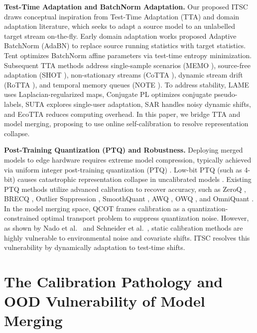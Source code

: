 \documentclass{article}
\theoremstyle{plain}
\theoremstyle{definition}
\theoremstyle{remark}
\begin{document}
\textbf{Test-Time Adaptation and BatchNorm Adaptation.} Our proposed ITSC draws conceptual inspiration from Test-Time Adaptation (TTA) and domain adaptation literature, which seeks to adapt a source model to an unlabelled target stream on-the-fly. Early domain adaptation works proposed Adaptive BatchNorm (AdaBN) \cite{li16adabn, li18} to replace source running statistics with target statistics. Tent \cite{wang21tent} optimizes BatchNorm affine parameters via test-time entropy minimization. Subsequent TTA methods address single-sample scenarios (MEMO \cite{zhang22memo}), source-free adaptation (SHOT \cite{liang20shot}), non-stationary streams (CoTTA \cite{wang22cotta}), dynamic stream drift (RoTTA \cite{yuan23rotta}), and temporal memory queues (NOTE \cite{gong22note}). To address stability, LAME \cite{boudiaf21lame} uses Laplacian-regularized maps, Conjugate PL \cite{goyal22conjugate} optimizes conjugate pseudo-labels, SUTA \cite{zhao23suta} explores single-user adaptation, SAR \cite{niu23sar} handles noisy dynamic shifts, and EcoTTA \cite{song23ecotta} reduces computing overhead. In this paper, we bridge TTA and model merging, proposing to use online self-calibration to resolve representation collapse.

\textbf{Post-Training Quantization (PTQ) and Robustness.} Deploying merged models to edge hardware requires extreme model compression, typically achieved via uniform integer post-training quantization (PTQ) \cite{gholami21}. Low-bit PTQ (such as 4-bit) causes catastrophic representation collapse in uncalibrated models \cite{anonymous26b}. Existing PTQ methods utilize advanced calibration to recover accuracy, such as ZeroQ \cite{cai20zeroq}, BRECQ \cite{li21brecq}, Outlier Suppression \cite{wei22outlier}, SmoothQuant \cite{xiao23smoothquant}, AWQ \cite{lin24awq}, OWQ \cite{lee23owq}, and OmniQuant \cite{shao24omniquant}. In the model merging space, QCOT \cite{anonymous26c} frames calibration as a quantization-constrained optimal transport problem to suppress quantization noise. However, as shown by Nado et al.\ \cite{nado20} and Schneider et al.\ \cite{schneider20}, static calibration methods are highly vulnerable to environmental noise and covariate shifts. ITSC resolves this vulnerability by dynamically adaptation to test-time shifts.

\section{The Calibration Pathology and OOD Vulnerability of Model Merging}
\label{sec:pathology}
\end{document}
